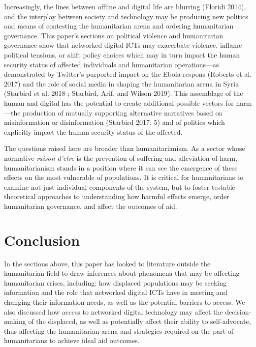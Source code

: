 Increasingly, the lines between offline and digital life are blurring
(Floridi 2014), and the interplay between society and technology may be
producing new politics and means of contesting the humanitarian arena
and ordering humanitarian governance. This paper's sections on political
violence and humanitarian governance show that networked digital ICTs
may exacerbate violence, inflame political tensions, or shift policy
choices which may in turn impact the human security status of affected
individuals and humanitarian operations---as demonstrated by Twitter's
purported impact on the Ebola respons (Roberts et al. 2017) and the role
of social media in shaping the humanitarian arena in Syria (Starbird et
al. 2018 ; Starbird, Arif, and Wilson 2019). This assemblage of the
human and digital has the potential to create additional possible
vectors for harm---the production of mutually supporting alternative
narratives based on misinformation or disinformation (Starbird 2017, 5)
and of politics which explicitly impact the human security status of the
affected.

The questions raised here are broader than humanitarianism. As a sector
whose normative \emph{raison d'etre} is the prevention of suffering and
alleviation of harm, humanitarianism stands in a position where it can
see the emergence of these effects on the most vulnerable of
populations. It is critical for humanitarians to examine not just
individual components of the system, but to foster testable theoretical
approaches to understanding how harmful effects emerge, order
humanitarian governance, and affect the outcomes of aid.

\hypertarget{conclusion}{%
\section{Conclusion}\label{conclusion}}

In the sections above, this paper has looked to literature outside the
humanitarian field to draw inferences about phenomena that may be
affecting humanitarian crises, including: how displaced populations may
be seeking information and the role that networked digital ICTs have in
meeting and changing their information needs, as well as the potential
barriers to access. We also discussed how access to networked digital
technology may affect the decision-making of the displaced, as well as
potentially affect their ability to self-advocate, thus affecting the
humanitarian arena and strategies required on the part of humanitarians
to achieve ideal aid outcomes.

